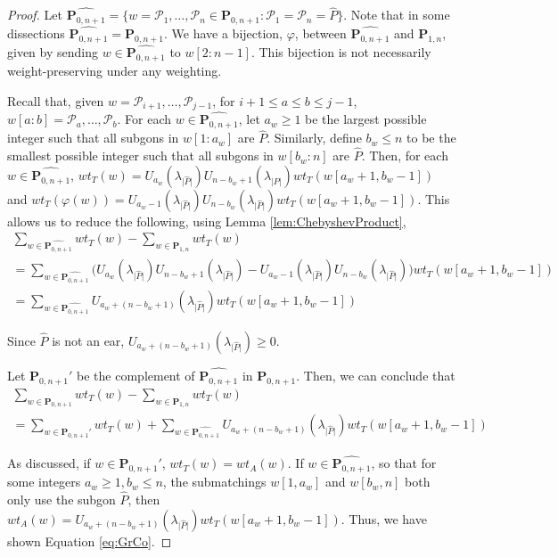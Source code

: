 \documentclass[12pt]{article}
\theoremstyle{remark}
\newcommand*{\pathset}[2]{\mathbf{P}_{#1,#2}}
\newcommand*{\poly}[1]{\mathcal{P}_{#1}}
\begin{document}
\begin{proof}
Let $\widehat{\pathset{0}{n+1}} = \{w = \poly{1},\ldots,\poly{n} \in \pathset{0}{n+1} : \poly{1} = \poly{n} = \hat{P}\}$. Note that in some dissections $\widehat{\pathset{0}{n+1}} = \pathset{0}{n+1}$. We have a bijection, $\varphi$, between $\widehat{\pathset{0}{n+1}}$ and $\pathset{1}{n}$, given by sending $w \in\widehat{\pathset{0}{n+1}}$ to $w[2:n-1]$. This bijection is not necessarily weight-preserving under any weighting.

Recall that, given $w = \poly{i+1},\ldots,\poly{j-1}$, for $i+1 \leq a \leq b \leq j-1$, $w[a:b] = \poly{a},\ldots,\poly{b}$. For each $w \in \widehat{\pathset{0}{n+1}}$, let $a_w \geq 1$ be the largest possible integer such that all subgons in $w[1:a_w]$ are $\hat{P}$. Similarly, define $b_w \leq n$ to be the smallest possible integer such that all subgons in $w[b_w:n]$  are $\hat{P}$. Then, for each $w \in \widehat{\pathset{0}{n+1}}$, $wt_T(w) = U_{a_w}(\lambda_{\vert \hat{P}\vert}) U_{n-b_w + 1}(\lambda_{\vert \hat{P}\vert})wt_T(w[a_w+1,b_w-1])$ and $wt_T(\varphi(w)) = U_{a_w-1}(\lambda_{\vert \hat{P}\vert}) U_{n-b_w}(\lambda_{\vert \hat{P}\vert})wt_T(w[a_w+1,b_w-1])$. This allows us to reduce the following, using Lemma \ref{lem:ChebyshevProduct}, \begin{align*}
\sum_{w \in \widehat{\pathset{0}{n+1}}} wt_T(w) - \sum_{w \in \pathset{1}{n}} wt_T(w)\\
=  \sum_{w \in \widehat{\pathset{0}{n+1}}} \bigg(U_{a_w}(\lambda_{\vert \hat{P}\vert}) U_{n-b_w + 1}(\lambda_{\vert \hat{P}\vert})  - U_{a_w-1}(\lambda_{\vert \hat{P}\vert}) U_{n-b_w}(\lambda_{\vert \hat{P}\vert})\bigg) wt_T(w[a_w+1,b_w-1]) \\
=  \sum_{w \in \widehat{\pathset{0}{n+1}}} U_{a_w + (n-b_w + 1)}(\lambda_{\vert \hat{P}\vert})wt_T(w[a_w+1,b_w-1])
\end{align*}

Since $\hat{P}$ is not an ear, $U_{a_w + (n-b_w+1)}(\lambda_{\vert \hat{P}\vert}) \geq 0$.

Let $\pathset{0}{n+1}'$ be the complement of $\widehat{\pathset{0}{n+1}}$ in $\pathset{0}{n+1}$. Then, we can conclude that \begin{align*}
\sum_{w \in\pathset{0}{n+1}} wt_T(w) - \sum_{w \in \pathset{1}{n}} wt_T(w)  \\ =  \sum_{w \in \pathset{0}{n+1}'} wt_T(w) + \sum_{w \in \widehat{\pathset{0}{n+1}}} U_{a_w + (n-b_w + 1)}(\lambda_{\vert \hat{P}\vert})wt_T(w[a_w+1,b_w-1])
\end{align*}

As discussed, if $w \in \pathset{0}{n+1}'$, $wt_T(w) = wt_A(w)$. If $w \in \widehat{\pathset{0}{n+1}}$, so that for some integers $a_w\geq 1, b_w \leq n$, the submatchings $w[1,a_w]$ and $w[b_w,n]$ both only use the subgon $\hat{P}$, then $wt_A(w) = U_{a_w + (n-b_w + 1)}(\lambda_{\vert \hat{P}\vert})wt_T(w[a_w+1,b_w-1])$. Thus, we have shown Equation \ref{eq:GrCo}.
\end{proof}
\end{document}
